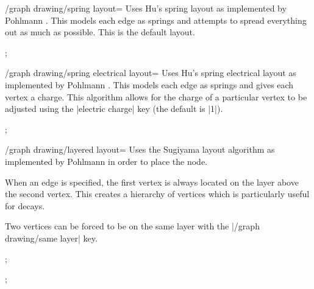 \documentclass[a4paper,final]{ltxdoc}
\begin{document}
\begin{key}{/graph drawing/spring layout=}
  Uses Hu's spring layout \cite{hu2005} as implemented by Pohlmann
  \cite{pohlmann2011}.  This models each edge as springs and attempts to spread
  everything out as much as possible.  This is the default layout.

\begin{codeexample}[]
;
\end{codeexample}
\end{key}

\begin{key}{/graph drawing/spring electrical layout=}
  Uses Hu's spring electrical layout \cite{hu2005} as implemented by Pohlmann
  \cite{pohlmann2011}.  This models each edge as springs and gives each vertex a
  charge.  This algorithm allows for the charge of a particular vertex to be
  adjusted using the |electric charge| key (the default is |1|).

\begin{codeexample}[]
;
\end{codeexample}
\end{key}

\begin{key}{/graph drawing/layered layout=}
  Uses the Sugiyama layout algorithm \cite{eades1991} as implemented by Pohlmann
  \cite{pohlmann2011} in order to place the node.

  When an edge is specified, the first vertex is always located on the layer
  above the second vertex.  This creates a hierarchy of vertices which is
  particularly useful for decays.

  Two vertices can be forced to be on the same layer with the
  |/graph drawing/same layer| key.

\begin{codeexample}[]
;
\end{codeexample}
\begin{codeexample}[]
;
\end{codeexample}
\end{key}
\end{document}
